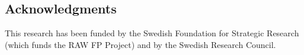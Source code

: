 \subsection*{Acknowledgments} 
This research has been funded by the Swedish Foundation for Strategic Research (which funds
the RAW FP Project) and
by the Swedish Research Council.



%
%





%

